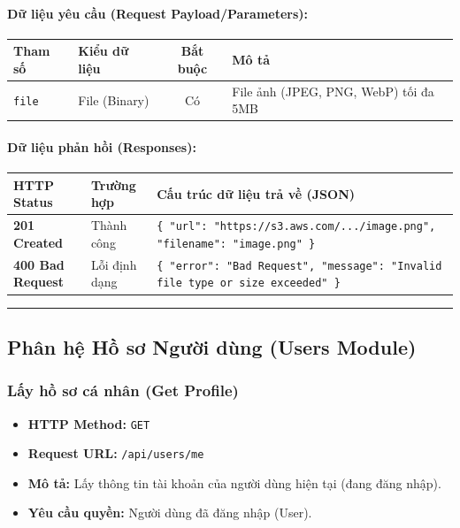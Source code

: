 \documentclass[12pt,a4paper]{article}
\begin{document}
\paragraph{Dữ liệu yêu cầu (Request Payload/Parameters):}
\begin{longtable}{|>{\raggedright\arraybackslash}p{2.8cm}|>{\raggedright\arraybackslash}p{2.2cm}|c|>{\raggedright\arraybackslash}p{7.0cm}|}
\hline
\textbf{Tham số} & \textbf{Kiểu dữ liệu} & \textbf{Bắt buộc} & \textbf{Mô tả} \\ \hline
\endhead
\texttt{file} & File (Binary) & Có & File ảnh (JPEG, PNG, WebP) tối đa 5MB \\ \hline
\end{longtable}

\paragraph{Dữ liệu phản hồi (Responses):}
\begin{longtable}{|>{\raggedright\arraybackslash}p{2.8cm}|>{\raggedright\arraybackslash}p{3.2cm}|>{\raggedright\arraybackslash}p{8.0cm}|}
\hline
\textbf{HTTP Status} & \textbf{Trường hợp} & \textbf{Cấu trúc dữ liệu trả về (JSON)} \\ \hline
\endhead
\textbf{201 Created} & Thành công & \texttt{\{ "url": "https://s3.aws.com/.../image.png", "filename": "image.png" \}} \\ \hline
\textbf{400 Bad Request} & Lỗi định dạng & \texttt{\{ "error": "Bad Request", "message": "Invalid file type or size exceeded" \}} \\ \hline
\end{longtable}

\vskip 0.4cm
\noindent\rule{\textwidth}{0.3pt}
\vskip 0.4cm

\subsection{Phân hệ Hồ sơ Người dùng (Users Module)}

\subsubsection{Lấy hồ sơ cá nhân (Get Profile)}
\begin{itemize}[leftmargin=*]
    \item \textbf{HTTP Method:} \texttt{GET}
    \item \textbf{Request URL:} \texttt{/api/users/me}
    \item \textbf{Mô tả:} Lấy thông tin tài khoản của người dùng hiện tại (đang đăng nhập).
    \item \textbf{Yêu cầu quyền:} Người dùng đã đăng nhập (User).
\end{itemize}
\end{document}
